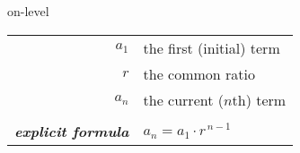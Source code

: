 \begin{taggedblock}{on-level}
    \begin{center}
        \begin{tcolorbox}[width=4in]
            \centering
            {
                \large
                \begin{tabular}{r|l}
                    $a_1$ & the first (initial) term \\
                    $r$ & the common ratio \\
                    $a_{n}$ & the current ($n$th) term \\
                    \\
                    {\large\bfseries\itshape explicit formula}
                        & {$a_n = a_1 \cdot r^{\,n-1}$ } \\
                \end{tabular}
            }
        \end{tcolorbox}
    \end{center}
\end{taggedblock}

